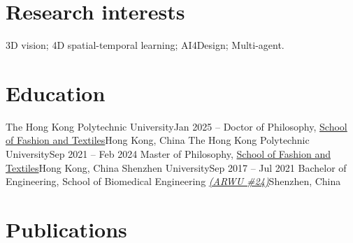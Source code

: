 \documentclass[letterpaper,11pt]{article}
\begin{document}
    \maketitle

    \section{Research interests}

    \begin{resumeItemize}
        \item 3D vision; 4D spatial-temporal learning; AI4Design; Multi-agent.
    \end{resumeItemize}
    
    \section{Education}

    \resumeColumnsStart
        \resumeEntry
            {The Hong Kong Polytechnic University}{Jan 2025 -- }
            {Doctor of Philosophy, \href{https://www.polyu.edu.hk/sft/}{School of Fashion and Textiles}}{Hong Kong, China}
        \resumeEntry
            {The Hong Kong Polytechnic University}{Sep 2021 -- Feb 2024}
            {Master of Philosophy, \href{https://www.polyu.edu.hk/sft/}{School of Fashion and Textiles}}{Hong Kong, China}
        \resumeEntry
            {Shenzhen University}{Sep 2017 -- Jul 2021}
            {Bachelor of Engineering, School of Biomedical Engineering
            \href{https://www.shanghairanking.com/rankings/gras/2023/RS0208}{\textsl{(ARWU \#24)}}}{Shenzhen, China}
    \resumeColumnsEnd

    \section{Publications}
\end{document}
